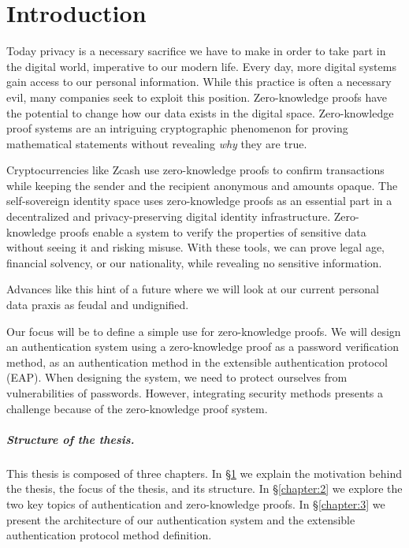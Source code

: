 \chapter{Introduction}
\label{chapter:1}

\noindent
Today privacy is a necessary sacrifice we have to make in order to take part in the digital world, imperative to our modern life.
Every day, more digital systems gain access to our personal information. While this practice is often a necessary evil, many companies seek to exploit this position.
Zero-knowledge proofs have the potential to change how our data exists in the digital space. 
Zero-knowledge proof systems are an intriguing cryptographic phenomenon for proving mathematical statements without revealing \textit{why} they are true.

Cryptocurrencies like Zcash \cite{hopwood2016zcash} use zero-knowledge proofs to confirm transactions while keeping the sender and the recipient anonymous and amounts opaque.
The self-sovereign identity space \cite{tobin2016inevitable} uses zero-knowledge proofs as an essential part in a decentralized and privacy-preserving digital identity infrastructure.
Zero-knowledge proofs enable a system to verify the properties \cite{10.1007/978-3-540-89255-7_15} of sensitive data without seeing it and risking misuse. With these tools, we can prove legal age, financial solvency, or our nationality, while revealing no sensitive information.

Advances like this hint of a future where we will look at our current personal data praxis as feudal and undignified.

\bigskip
\noindent
Our focus will be to define a simple use for zero-knowledge proofs.
We will design an authentication system using a zero-knowledge proof as a password verification method, as an authentication method in the extensible authentication protocol (EAP).
When designing the system, we need to protect ourselves from vulnerabilities of passwords.
However, integrating security methods presents a challenge because of the zero-knowledge proof system.

\paragraph{Structure of the thesis.}
This thesis is composed of three chapters.
In \S\ref{chapter:1} we explain the motivation behind the thesis, the focus of the thesis, and its structure.
In \S\ref{chapter:2} we explore the two key topics of authentication and zero-knowledge proofs.
In \S\ref{chapter:3} we present the architecture of our authentication system and the extensible authentication protocol method definition.

\newpage